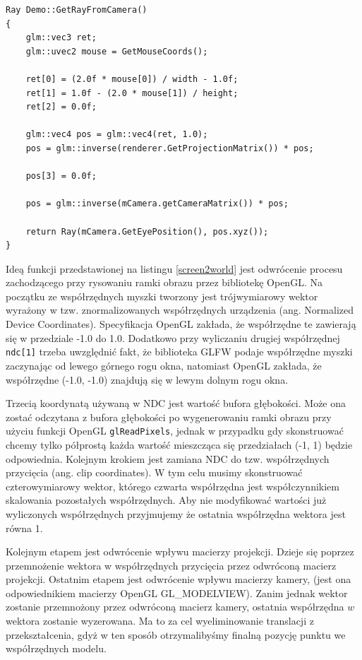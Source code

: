 \begin{lstlisting}[caption=Estymacja wektora w przstrzeni trójwymiarowej na
	podstawie pozycji myszki na ekranie, label=screen2world]
Ray Demo::GetRayFromCamera()
{
	glm::vec3 ret;
	glm::uvec2 mouse = GetMouseCoords();

	ret[0] = (2.0f * mouse[0]) / width - 1.0f;
	ret[1] = 1.0f - (2.0 * mouse[1]) / height;
	ret[2] = 0.0f;

	glm::vec4 pos = glm::vec4(ret, 1.0);
	pos = glm::inverse(renderer.GetProjectionMatrix()) * pos;

	pos[3] = 0.0f;

	pos = glm::inverse(mCamera.getCameraMatrix()) * pos;

	return Ray(mCamera.GetEyePosition(), pos.xyz());
}
\end{lstlisting}

Ideą funkcji przedstawionej na listingu \ref{screen2world} jest odwrócenie
procesu zachodzącego przy rysowaniu ramki obrazu przez bibliotekę OpenGL.
Na początku ze współrzędnych myszki tworzony jest trójwymiarowy wektor
wyrażony w tzw. znormalizowanych współrzędnych urządzenia (ang. Normalized
		Device Coordinates). Specyfikacja OpenGL zakłada, że współrzędne te zawierają się w
przedziale -1.0 do 1.0. Dodatkowo przy wyliczaniu drugiej współrzędnej
\texttt{ndc[1]} trzeba uwzględnić fakt, że biblioteka GLFW podaje współrzędne
myszki zaczynając od lewego górnego rogu okna, natomiast OpenGL zakłada, że
współrzędne (-1.0, -1.0) znajdują się w lewym dolnym rogu okna.

Trzecią koordynatą używaną w NDC jest wartość bufora głębokości. Może ona zostać
odczytana z bufora głębokości po wygenerowaniu ramki obrazu przy użyciu funkcji
OpenGL \texttt{glReadPixels}, jednak w przypadku gdy skonstruować chcemy tylko
półprostą każda wartość mieszcząca się przedziałach (-1, 1) będzie odpowiednia.
Kolejnym krokiem jest zamiana NDC do tzw. współrzędnych przycięcia (ang. clip
		coordinates). W tym celu musimy skonstruować czterowymiarowy wektor,
		 którego czwarta współrzędna jest współczynnikiem skalowania pozostałych
		 współrzędnych. Aby nie modyfikować wartości już wyliczonych
		 współrzędnych przyjmujemy że ostatnia współrzędna wektora jest równa 1.
		 
Kolejnym etapem jest odwrócenie wpływu macierzy projekcji. Dzieje się
poprzez przemnożenie wektora w współrzędnych przycięcia przez odwróconą
macierz projekcji. Ostatnim etapem jest odwrócenie wpływu macierzy
kamery, (jest ona odpowiednikiem macierzy OpenGL GL\_MODELVIEW).
Zanim jednak wektor zostanie przemnożony przez odwróconą macierz kamery,
	  ostatnia współrzędna $w$ wektora zostanie wyzerowana. Ma to za cel
	  wyeliminowanie translacji z przekształcenia, gdyż w ten sposób
	  otrzymalibyśmy finalną pozycję punktu we współrzędnych modelu.

